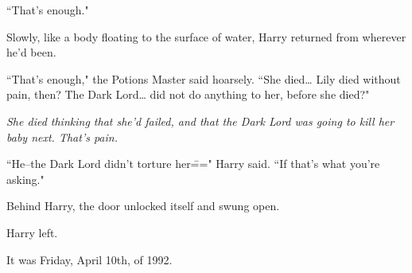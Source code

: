 ``That's enough."

Slowly, like a body floating to the surface of water, Harry returned from wherever he'd been.

``That's enough," the Potions Master said hoarsely. ``She died{\ldots} Lily died without pain, then? The Dark Lord{\ldots} did not do anything to her, before she died?"

\emph{She died thinking that she'd failed, and that the Dark Lord was going to kill her baby next. That's pain.}

``He\---the Dark Lord didn't torture her\===" Harry said. ``If that's what you're asking."

Behind Harry, the door unlocked itself and swung open.

Harry left.

It was Friday, April 10th, of 1992.

